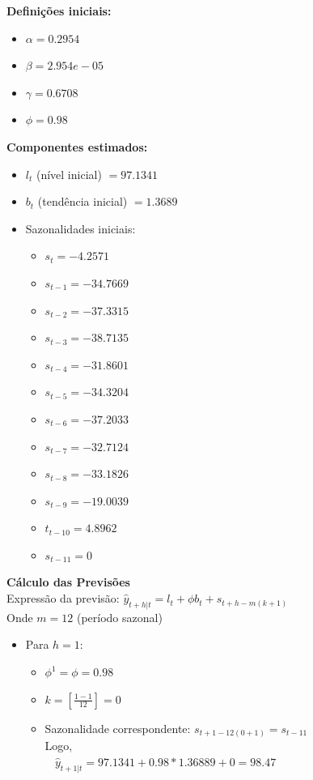 \documentclass[a4paper, 12pt]{article}
\begin{document}
\textbf{Definições iniciais:}
\begin{itemize}
    \item $\alpha = 0.2954$
    \item $\beta = 2.954e-05$
    \item $\gamma = 0.6708$
    \item $\phi = 0.98$
\end{itemize}

\textbf{Componentes estimados:}
\begin{itemize}
    \item $l_t$ (nível inicial) $= 97.1341$
    \item $b_t$ (tendência inicial) $= 1.3689$
    \item Sazonalidades iniciais:
    \begin{itemize}
        \item $s_{t} = -4.2571$
        \item $s_{t-1} = -34.7669$
        \item $s_{t-2} = -37.3315$
        \item $s_{t-3} = -38.7135$
        \item $s_{t-4} = -31.8601$
        \item $s_{t-5} = -34.3204$
        \item $s_{t-6} = -37.2033$
        \item $s_{t-7} = -32.7124$
        \item $s_{t-8} = -33.1826$
        \item $s_{t-9} = -19.0039$
        \item $t_{t-10} = 4.8962$
        \item $s_{t-11} = 0$
    \end{itemize}
\end{itemize}

\textbf{Cálculo das Previsões}\\

Expressão da previsão: $\hat y_{t+h|t} = l_t + \phi b_t + s_{t+h-m(k+1)}$ \\ 

Onde $m=12$ (período sazonal)\\

\begin{itemize}
    \item Para $h = 1$:
    \begin{itemize}
        \item $\phi^1 = \phi = 0.98$
        \item $k = [\frac{1-1}{12}] = 0$
        \item Sazonalidade correspondente: $s_{t+1-12(0+1)} = s_{t-11}$\\
        
        Logo,\\

        $\>\ \>\ \hat y_{t+1|t} = 97.1341 + 0.98 * 1.36889 + 0 = 98.47$
    \end{itemize} 
\end{itemize}
\end{document}

